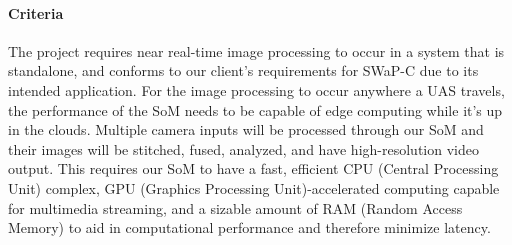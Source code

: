 \paragraph{Criteria}

The project requires near real-time image processing to occur in a system that is 
standalone, and conforms to our client's requirements for SWaP-C due to its intended application. For the image processing to 
occur anywhere a UAS travels, the performance of the SoM 
needs to be capable of edge computing while it's up in the clouds.
Multiple camera inputs will be processed through our SoM and their images will be 
stitched, fused, analyzed, and have high-resolution video output. This requires our 
SoM to have a fast, efficient CPU (Central Processing Unit) complex, GPU 
(Graphics Processing Unit)-accelerated computing capable for multimedia streaming, and 
a sizable amount of RAM (Random Access Memory) to aid in computational performance 
and therefore minimize latency.\\

